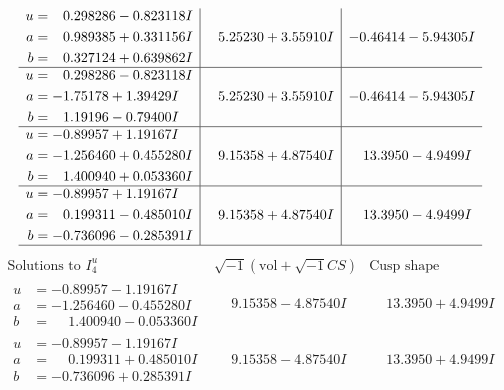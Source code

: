 \documentclass[1p]{elsarticle_modified}
\theoremstyle{definition}
\newcommand{\I}{\sqrt{-1}}
\begin{document}
$$\begin{array}{c|c|c}
\begin{aligned}
u &= \phantom{-}0.298286 - 0.823118 I \\
a &= \phantom{-}0.989385 + 0.331156 I \\
b &= \phantom{-}0.327124 + 0.639862 I\end{aligned}
 & \phantom{-}5.25230 + 3.55910 I & -0.46414 - 5.94305 I \\ \hline\begin{aligned}
u &= \phantom{-}0.298286 - 0.823118 I \\
a &= -1.75178 + 1.39429 I \\
b &= \phantom{-}1.19196 - 0.79400 I\end{aligned}
 & \phantom{-}5.25230 + 3.55910 I & -0.46414 - 5.94305 I \\ \hline\begin{aligned}
u &= -0.89957 + 1.19167 I \\
a &= -1.256460 + 0.455280 I \\
b &= \phantom{-}1.400940 + 0.053360 I\end{aligned}
 & \phantom{-}9.15358 + 4.87540 I & \phantom{-}13.3950 - 4.9499 I \\ \hline\begin{aligned}
u &= -0.89957 + 1.19167 I \\
a &= \phantom{-}0.199311 - 0.485010 I \\
b &= -0.736096 - 0.285391 I\end{aligned}
 & \phantom{-}9.15358 + 4.87540 I & \phantom{-}13.3950 - 4.9499 I\\
 \hline 
 \end{array}$$\newpage$$\begin{array}{c|c|c}  
\text{Solutions to }I^u_{4}& \I (\text{vol} + \sqrt{-1}CS) & \text{Cusp shape}\\
 \hline 
\begin{aligned}
u &= -0.89957 - 1.19167 I \\
a &= -1.256460 - 0.455280 I \\
b &= \phantom{-}1.400940 - 0.053360 I\end{aligned}
 & \phantom{-}9.15358 - 4.87540 I & \phantom{-}13.3950 + 4.9499 I \\ \hline\begin{aligned}
u &= -0.89957 - 1.19167 I \\
a &= \phantom{-}0.199311 + 0.485010 I \\
b &= -0.736096 + 0.285391 I\end{aligned}
 & \phantom{-}9.15358 - 4.87540 I & \phantom{-}13.3950 + 4.9499 I \\ \hline\begin{aligned}

\end{aligned}
\end{array}$$
\end{document}
